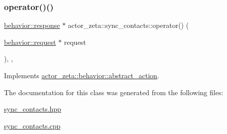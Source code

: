 \subsubsection{\texorpdfstring{operator()()}{operator()()}}
{\footnotesize\ttfamily \hyperlink{classactor__zeta_1_1behavior_1_1response}{behavior\+::response} $\ast$ actor\+\_\+zeta\+::sync\+\_\+contacts\+::operator() (\begin{DoxyParamCaption}\item[{\hyperlink{classactor__zeta_1_1behavior_1_1request}{behavior\+::request} $\ast$}]{request }\end{DoxyParamCaption})\hspace{0.3cm}{\ttfamily [final]}, {\ttfamily [override]}, {\ttfamily [virtual]}}



Implements \hyperlink{classactor__zeta_1_1behavior_1_1abstract__action_a5e48075d77fbd93615fc9b757e6a4d87}{actor\+\_\+zeta\+::behavior\+::abstract\+\_\+action}.



The documentation for this class was generated from the following files\+:\begin{DoxyCompactItemize}
\item 
\hyperlink{sync__contacts_8hpp}{sync\+\_\+contacts.\+hpp}\item 
\hyperlink{sync__contacts_8cpp}{sync\+\_\+contacts.\+cpp}\end{DoxyCompactItemize}
